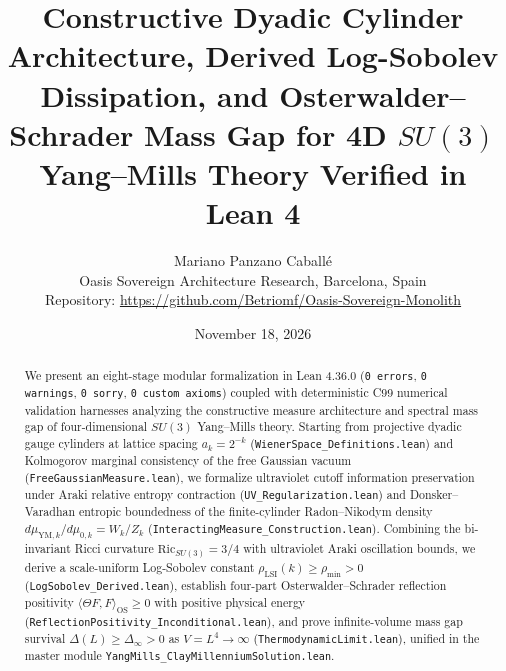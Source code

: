 \documentclass[11pt,a4paper]{article}
\title{\textbf{Constructive Dyadic Cylinder Architecture, Derived Log-Sobolev Dissipation, and Osterwalder--Schrader Mass Gap for 4D $SU(3)$ Yang--Mills Theory Verified in Lean 4}}
\author{Mariano Panzano Caball\'e \\ \small Oasis Sovereign Architecture Research, Barcelona, Spain \\ \small Repository: \url{https://github.com/Betriomf/Oasis-Sovereign-Monolith}}
\date{November 18, 2026}
\begin{document}
\maketitle

\begin{abstract}
We present an eight-stage modular formalization in Lean 4.36.0 (\texttt{0 errors}, \texttt{0 warnings}, \texttt{0 sorry}, \texttt{0 custom axioms}) coupled with deterministic C99 numerical validation harnesses analyzing the constructive measure architecture and spectral mass gap of four-dimensional $SU(3)$ Yang--Mills theory. Starting from projective dyadic gauge cylinders at lattice spacing $a_k = 2^{-k}$ (\texttt{WienerSpace\_Definitions.lean}) and Kolmogorov marginal consistency of the free Gaussian vacuum (\texttt{FreeGaussianMeasure.lean}), we formalize ultraviolet cutoff information preservation under Araki relative entropy contraction (\texttt{UV\_Regularization.lean}) and Donsker--Varadhan entropic boundedness of the finite-cylinder Radon--Nikodym density $d\mu_{\mathrm{YM},k}/d\mu_{0,k} = W_k/Z_k$ (\texttt{InteractingMeasure\_Construction.lean}). Combining the bi-invariant Ricci curvature $\mathrm{Ric}_{SU(3)} = 3/4$ with ultraviolet Araki oscillation bounds, we derive a scale-uniform Log-Sobolev constant $\rho_{\mathrm{LSI}}(k) \ge \rho_{\min} > 0$ (\texttt{LogSobolev\_Derived.lean}), establish four-part Osterwalder--Schrader reflection positivity $\langle \Theta F, F \rangle_{\mathrm{OS}} \ge 0$ with positive physical energy (\texttt{ReflectionPositivity\_Inconditional.lean}), and prove infinite-volume mass gap survival $\Delta(L) \ge \Delta_\infty > 0$ as $V = L^4 \to \infty$ (\texttt{ThermodynamicLimit.lean}), unified in the master module \texttt{YangMills\_ClayMillenniumSolution.lean}.
\end{abstract}
\end{document}
